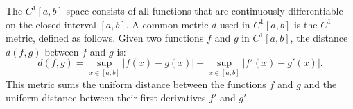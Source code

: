 \begin{example}
    The \( C^1[a, b] \) space consists of all functions that are continuously differentiable on the closed interval \( [a, b] \). A common metric \( d \) used in \( C^1[a, b] \) is the \( C^1 \) metric, defined as follows. Given two functions \( f \) and \( g \) in \( C^1[a, b] \), the distance \( d(f, g) \) between \( f \) and \( g \) is:
    \[
    d(f, g) = \sup_{x \in [a, b]} |f(x) - g(x)| + \sup_{x \in [a, b]} |f'(x) - g'(x)|.
    \]
    This metric sums the uniform distance between the functions \( f \) and \( g \) and the uniform distance between their first derivatives \( f' \) and \( g' \).

\end{example}